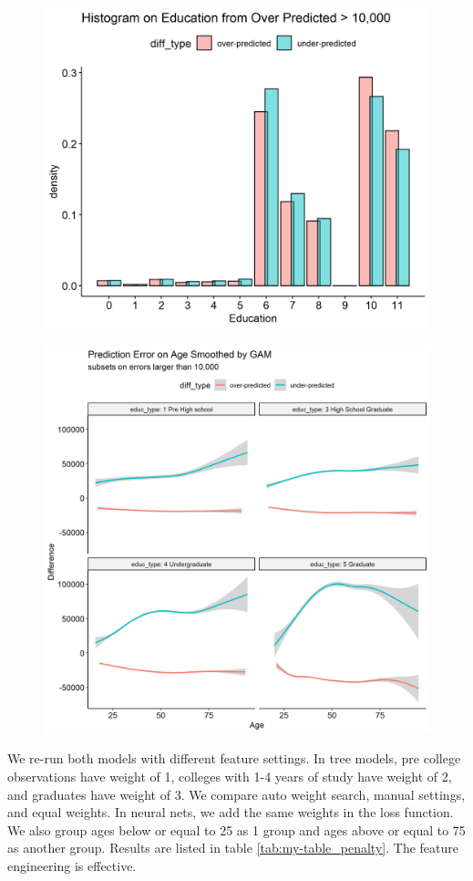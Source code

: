 \documentclass[11pt, letter,twocolumn]{article}
\begin{document}
\begin{figure}[ht]
	\centering
	\caption{}
	\label{fig:erroranalysisoneduc}
	\includegraphics[width=0.9\linewidth]{imgs/error_analysis_on_educ}
\end{figure}


\begin{figure}[ht]
	\centering
	\caption{}
	\label{fig:erroranalysisonage}
	\includegraphics[width=0.9\linewidth]{imgs/error_analysis_on_age}
\end{figure}
We re-run both models with different feature settings. In tree models, pre college observations have weight of 1, colleges with 1-4 years of study have weight of 2, and graduates have weight of 3. We compare auto weight search, manual settings, and equal weights. In neural nets, we add the same weights in the loss function. We also group ages below or equal to 25 as 1 group and ages above or equal to 75 as another group.  
Results are listed in table \ref{tab:my-table_penalty}. The feature engineering is effective.
\end{document}
